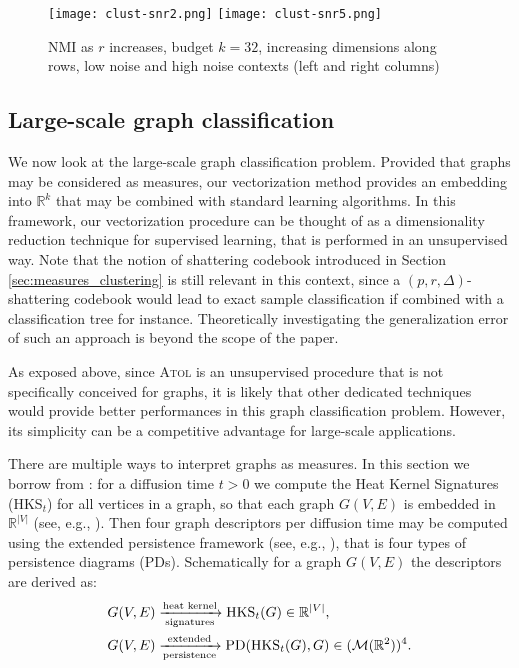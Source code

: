 \documentclass[noinfoline,preprint]{article}
\newcommand{\R}{\mathbb{R}}
\renewcommand{\1}{\mathds 1}
\begin{document}
\begin{figure}[h!]
	\centering
	\texttt{[image: clust-snr2.png]}
	\texttt{[image: clust-snr5.png]}
	\caption{NMI as $r$ increases, budget $k = 32$, increasing dimensions along rows, low noise and high noise contexts (left and right columns)}
	\label{fig:mmc-snr}
\end{figure}


\subsection{Large-scale graph classification}

We now look at the large-scale graph classification problem. Provided that graphs may be considered as measures, our vectorization method provides an embedding into $\R^k$ that may be combined with standard learning algorithms. In this framework, our vectorization procedure can be thought of as a dimensionality reduction technique for supervised learning, that is performed in an unsupervised way. Note that the notion of shattering codebook introduced in Section \ref{sec:measures_clustering} is still relevant in this context, since a $(p,r,\Delta)$-shattering codebook would lead to exact sample classification if combined with a classification tree for instance. Theoretically investigating the generalization error of such an approach is beyond the scope of the paper. 
    
As exposed above, since \textsc{Atol} is an unsupervised procedure that is not specifically conceived for graphs, it is likely that other dedicated techniques would provide better performances in this graph classification problem. However, its simplicity can be a competitive advantage for large-scale applications. 

There are multiple ways to interpret graphs as measures. In this section we borrow from \cite{Carriere19}: for a  diffusion time $t>0$ we compute the Heat Kernel Signatures (HKS$_t$) for all vertices in a graph, so that each graph $G(V, E)$ is embedded in $\mathbb{R}^{|V|}$ (see, e.g., \cite[Section 2.2]{Carriere19}). Then four graph descriptors per diffusion time may be computed using the extended persistence framework (see, e.g.,  \cite[Section 2.1]{Carriere19}), that is four types of persistence diagrams (PDs). Schematically for a graph $G(V, E)$ the descriptors are derived as:
\begin{align}
G(V, E) &\xrightarrow[\text{signatures}]{\text{heat kernel}} \text{HKS}_{t}(G) \in \mathbb{R}^{|V|}, \notag \\
	G(V, E) &\xrightarrow[\text{persistence}]{\text{extended}} \text{PD}(\text{HKS}_{t}(G), G) \in (\mathcal{M}(\mathbb{R}^2))^{4}.	\label{eq:graphpds}
\end{align}
\end{document}
